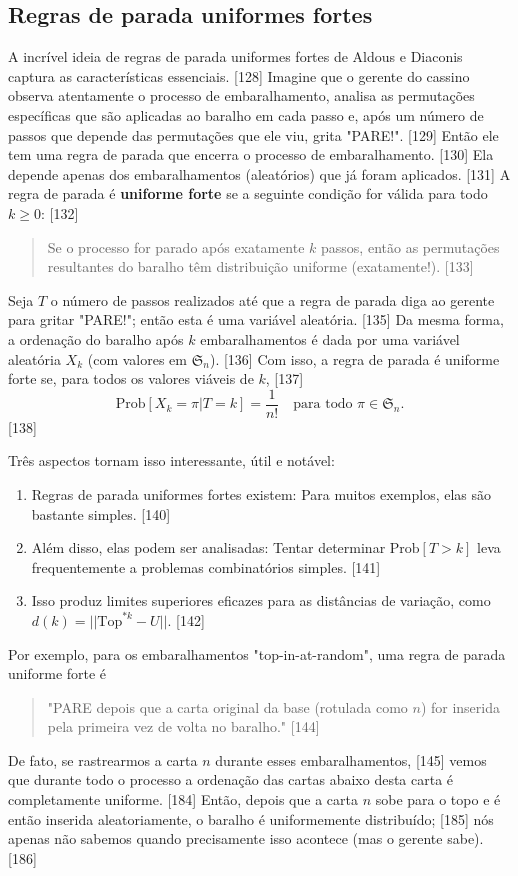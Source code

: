\documentclass[a4paper]{article}
\begin{document}
\subsection{Regras de parada uniformes fortes}
A incrível ideia de regras de parada uniformes fortes de Aldous e Diaconis captura as características essenciais. [128] Imagine que o gerente do cassino observa atentamente o processo de embaralhamento, analisa as permutações específicas que são aplicadas ao baralho em cada passo e, após um número de passos que depende das permutações que ele viu, grita "PARE!". [129] Então ele tem uma regra de parada que encerra o processo de embaralhamento. [130] Ela depende apenas dos embaralhamentos (aleatórios) que já foram aplicados. [131] A regra de parada é \textbf{uniforme forte} se a seguinte condição for válida para todo $k \ge 0$: [132]
\begin{quote}
    Se o processo for parado após exatamente $k$ passos, então as permutações resultantes do baralho têm distribuição uniforme (exatamente!). [133]
\end{quote}

Seja $T$ o número de passos realizados até que a regra de parada diga ao gerente para gritar "PARE!"; então esta é uma variável aleatória. [135] Da mesma forma, a ordenação do baralho após $k$ embaralhamentos é dada por uma variável aleatória $X_k$ (com valores em $\mathfrak{S}_n$). [136] Com isso, a regra de parada é uniforme forte se, para todos os valores viáveis de $k$, [137]
$$ \text{Prob}[X_k = \pi | T = k] = \frac{1}{n!} \quad \text{para todo } \pi \in \mathfrak{S}_n. $$ [138]

Três aspectos tornam isso interessante, útil e notável:
\begin{enumerate}
    \item Regras de parada uniformes fortes existem: Para muitos exemplos, elas são bastante simples. [140]
    \item Além disso, elas podem ser analisadas: Tentar determinar $\text{Prob}[T > k]$ leva frequentemente a problemas combinatórios simples. [141]
    \item Isso produz limites superiores eficazes para as distâncias de variação, como $d(k) = ||\text{Top}^{*k} - U||$. [142]
\end{enumerate}

Por exemplo, para os embaralhamentos "top-in-at-random", uma regra de parada uniforme forte é
\begin{quote}
    "PARE depois que a carta original da base (rotulada como $n$) for inserida pela primeira vez de volta no baralho." [144]
\end{quote}
De fato, se rastrearmos a carta $n$ durante esses embaralhamentos, [145] vemos que durante todo o processo a ordenação das cartas abaixo desta carta é completamente uniforme. [184] Então, depois que a carta $n$ sobe para o topo e é então inserida aleatoriamente, o baralho é uniformemente distribuído; [185] nós apenas não sabemos quando precisamente isso acontece (mas o gerente sabe). [186]
\end{document}
